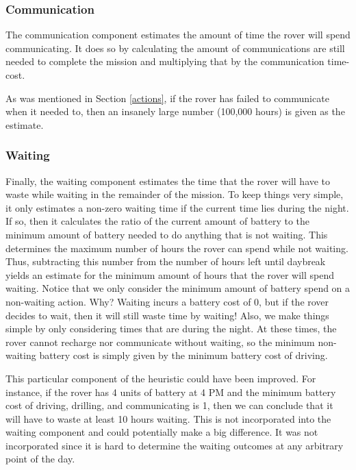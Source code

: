 		\subsubsection{Communication}
		
		The communication component estimates the amount of time the rover will spend communicating. It does so by
		calculating the amount of communications are still needed to complete the mission and multiplying that by the
		communication time-cost.
		
		As was mentioned in Section \ref{actions}, if the rover has failed to communicate when it needed to, then an
		insanely large number (100,000 hours) is given as the estimate.
		
		\subsubsection{Waiting}
		
		Finally, the waiting component estimates the time that the rover will have to waste while waiting in the
		remainder of the mission. To keep things very simple, it only estimates a non-zero waiting time if the
		current time lies during the night. If so, then it calculates the ratio of the current amount of battery
		to the minimum amount of battery needed to do anything that is not waiting. This determines the maximum
		number of hours the rover can spend while not waiting. Thus, subtracting this number from the number of
		hours left until daybreak yields an estimate for the minimum amount of hours that the rover will spend
		waiting. Notice that we only consider the minimum amount of battery spend on a non-waiting action. Why?
		Waiting incurs a battery cost of 0, but if the rover decides to wait, then it will still waste time by
		waiting! Also, we make things simple by only considering times that are during the night. At these times,
		the rover cannot recharge nor communicate without waiting, so the minimum non-waiting battery cost is
		simply given by the minimum battery cost of driving.
		
		This particular component of the heuristic could have been improved. For instance, if the rover has 4 units
		of battery at 4 PM and the minimum battery cost of driving, drilling, and communicating is 1, then we can
		conclude that it will have to waste at least 10 hours waiting. This is not incorporated into the waiting
		component and could potentially make a big difference. It was not incorporated since it is hard to
		determine the waiting outcomes at any arbitrary point of the day.